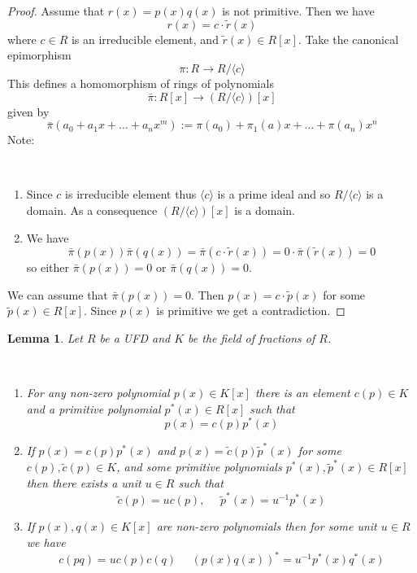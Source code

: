 \documentclass[12pt, letterpaper, oneside]{article}
\theoremstyle{plain}
\newtheorem{lemma}[theorem]{Lemma}
\theoremstyle{definition}
\newcommand{\lra}{\longrightarrow}
\newcommand{\subgp}[1]{\langle#1\rangle}
\newcommand{\benu}{\begin{enumerate}}
\newcommand{\eenu}{\end{enumerate}}
\newcommand{\vs}{\vskip 5mm}
\newcommand{\isep}[1][0]{\setlength{\itemsep}{#1 mm}}
\begin{document}
 \begin{proof}
 Assume that $r(x) = p(x)q(x)$ is not primitive. Then  we have 
 $$r(x) = c\cdot \tilde r(x)$$
 where  $c\in R$ is an irreducible element, and $\tilde r(x)\in R[x]$.  Take the canonical epimorphism
 $$\pi\colon R \lra R/\subgp{c}$$
 This defines a homomorphism of rings of polynomials
 $$\bar{\pi}\colon R[x] \lra (R/\subgp{c})[x]$$
 given by 
 $$\bar{\pi}(a_{0} + a_{1}x+{\dots} + a_{n}x^{m}):= \pi(a_{0}) + \pi_{1}(a)x + {\dots} + \pi(a_{n})x^{n}$$
Note: 

\vskip -13mm

\ 
\benu
\isep[0]
\item Since $c$ is irreducible element thus $\subgp{c}$ is a prime ideal and so $R/\subgp{c}$ is a 
domain. As a consequence $(R/\subgp{c})[x]$ is a domain.
\item We have
$$\bar{\pi}(p(x))\bar{\pi}(q(x)) = \bar{\pi}(c\cdot \tilde r(x)) = 0\cdot\bar{\pi}(\tilde r(x)) = 0$$
so either $\bar{\pi}(p(x))=0$ or $\bar{\pi}(q(x))=0$. 
\eenu

We can assume that $\bar{\pi}(p(x))=0$. 
Then $p(x) = c\cdot \tilde p(x)$ for some $\tilde p(x)\in R[x]$. Since $p(x)$ is primitive we
get a contradiction. 



 \end{proof}
 
 
 \vs\vs
 
 \begin{lemma}
 \label{LEMMA_POLYCONTENT}
 Let $R$ be a UFD and $K$ be the field of fractions of $R$. 
 
 \vskip -13mm
 
 \ 
 \benu
 \item For any non-zero polynomial $p(x)\in K[x]$ there is an element $c(p)\in K$ 
 and a primitive polynomial $p^{\ast}(x)\in R[x]$ such that 
 $$p(x) = c(p)p^{\ast}(x)$$
 
 \item If $p(x) = c(p)p^{\ast}(x)$ and $p(x) = \tilde c(p)\tilde p^{\ast}(x)$ for some 
 $c(p), \tilde c(p)\in K$, and some primitive polynomials $p^{\ast}(x), \tilde p^{\ast}(x)\in R[x]$
 then there exists a unit $u\in R$ such that 
 $$\tilde c(p) = uc(p), \ \ \ \ \ \ \tilde p^{\ast}(x) = u^{-1}p^{\ast}(x)$$
 
 \item If $p(x), q(x)\in K[x]$ are non-zero polynomials then for some unit $u\in R$ we have 
 $$c(pq) = u c(p)c(q)\ \ \ \ \ \  (p(x)q(x))^{\ast} = u^{-1}p^{\ast}(x)q^{\ast}(x)$$
 \eenu
  
 \end{lemma}
 
\end{document}

